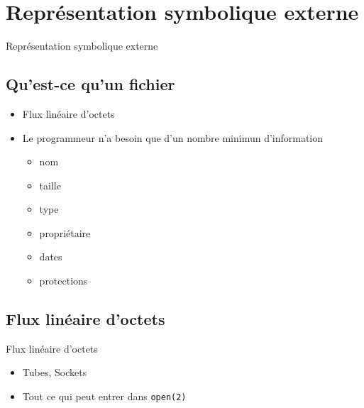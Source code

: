\def\sectitle{Représentation symbolique externe}
\section{\sectitle}
\begin{frame}{\sectitle}
\begin{block}{\subsectitle}
\def\subsectitle{Qu'est-ce qu'un fichier}
\subsection{\subsectitle}
\begin{itemize}
    \item Flux linéaire d'octets
    \item Le programmeur n'a besoin que d'un nombre minimun d'information
    \begin{itemize}
        \item nom
        \item taille
        \item type
        \item propriétaire
        \item dates
        \item protections
    \end{itemize}
\end{itemize}
\end{block}

\def\subsectitle{Flux linéaire d'octets}
\subsection{\subsectitle}
\begin{exampleblock}{\subsectitle}
\begin{itemize}
    \item Tubes, Sockets
    \item Tout ce qui peut entrer dans \texttt{open(2)}
\end{itemize}
\end{exampleblock}
\end{frame}


